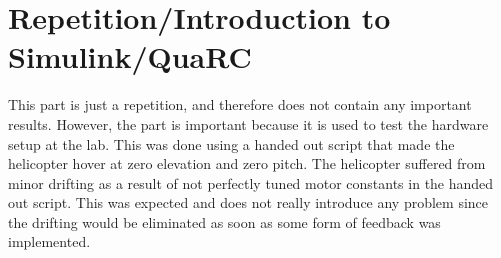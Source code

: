 \section{Repetition/Introduction to Simulink/QuaRC}\label{sec:prob1}

This part is just a repetition, and therefore does not contain any important results. However, the part is important because it is used to test the hardware setup at the lab. This was done using a handed out script that made the helicopter hover at zero elevation and zero pitch. The helicopter suffered from minor drifting as a result of not perfectly tuned motor constants in the handed out script. This was expected and does not really introduce any problem since the drifting would be eliminated as soon as some form of feedback was implemented.